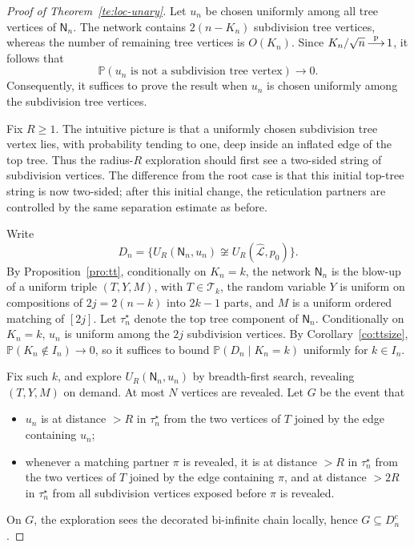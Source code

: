 \documentclass[english,11pt]{smfart}
\newcommand{\Prb}[1]{\mathbb{P}\left(#1\right)}
\newcommand{\convp}{\,{\buildrel \mathrm{p} \over \longrightarrow}\,}
\newcommand{\cL}{\mathcal{L}}
\newcommand{\cT}{\mathcal{T}}
\newcommand{\mN}{\mathsf{N}}
\numberwithin{equation}{section}
\begin{document}
\begin{proof}[Proof of Theorem~\ref{te:loc-unary}]
Let \(u_n\) be chosen uniformly among all tree vertices of \(\mN_n\).
The network contains \(2(n-K_n)\) subdivision tree vertices, whereas the
number of remaining tree vertices is \(O(K_n)\). Since
\(K_n/\sqrt n\convp1\), it follows that
\[
\Prb{u_n\text{ is not a subdivision tree vertex}}\longrightarrow0.
\]
Consequently, it suffices to prove the result when \(u_n\) is chosen
uniformly among the subdivision tree vertices.
\smallskip

Fix \(R\ge1\). The intuitive picture is that a uniformly chosen subdivision
tree vertex lies, with probability tending to one, deep inside an inflated edge
of the top tree. Thus the radius-\(R\) exploration should first see a two-sided
string of subdivision vertices. The difference from the root case is that this
initial top-tree string is now two-sided; after this initial change, the
reticulation partners are controlled by the same separation estimate as before.

\smallskip
Write
\[
  D_n=\{U_R(\mN_n,u_n)\not\cong U_R(\hat{\cL},p_0)\}.
\]
By Proposition~\ref{pro:tt}, conditionally on \(K_n=k\), the network
\(\mN_n\) is the blow-up of a uniform triple \((T,Y,M)\), with
\(T\in\cT_k\), the random variable \(Y\) is uniform on compositions of \(2j=2(n-k)\) into \(2k-1\)
parts, and \(M\) is a uniform ordered matching of \([2j]\). Let \(\tau_n^{\star}\)
denote the top tree component of \(\mN_n\). Conditionally on \(K_n=k\),
\(u_n\) is uniform among the \(2j\) subdivision vertices. By
Corollary~\ref{co:ttsize}, \(\Prb{K_n\notin I_n}\to0\), so it suffices to
bound \(\Prb{D_n\mid K_n=k}\) uniformly for \(k\in I_n\).

\smallskip
Fix such \(k\), and explore \(U_R(\mN_n,u_n)\) by breadth-first search,
revealing \((T,Y,M)\) on demand. At most \(N\) vertices are revealed. Let
\(G\) be the event that
\begin{itemize}\itemsep0pt
\item \(u_n\) is at distance \(>R\) in \(\tau_n^{\star}\) from the two vertices of
  \(T\) joined by the edge containing \(u_n\);
\item whenever a matching partner \(\pi\) is revealed, it is at distance \(>R\)
  in \(\tau_n^{\star}\) from the two vertices of \(T\) joined by the edge containing
  \(\pi\), and at distance \(>2R\) in \(\tau_n^{\star}\) from all subdivision vertices
  exposed before \(\pi\) is revealed.
\end{itemize}
On \(G\), the exploration sees the decorated bi-infinite chain locally, hence
\(G\subseteq D_n^c\).


\end{proof}
\end{document}

